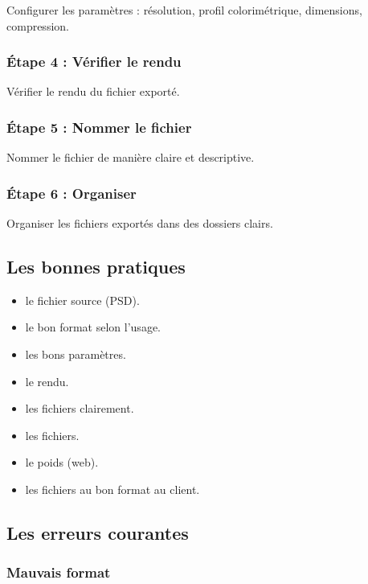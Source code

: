 Configurer les paramètres : résolution, profil colorimétrique, dimensions, compression.

\subsubsection{Étape 4 : Vérifier le rendu}

Vérifier le rendu du fichier exporté.

\subsubsection{Étape 5 : Nommer le fichier}

Nommer le fichier de manière claire et descriptive.

\subsubsection{Étape 6 : Organiser}

Organiser les fichiers exportés dans des dossiers clairs.

\subsection{Les bonnes pratiques}

\begin{itemize}
    \item {} le fichier source (PSD).
    \item {} le bon format selon l'usage.
    \item {} les bons paramètres.
    \item {} le rendu.
    \item {} les fichiers clairement.
    \item {} les fichiers.
    \item {} le poids (web).
    \item {} les fichiers au bon format au client.
\end{itemize}

\subsection{Les erreurs courantes}

\subsubsection{Mauvais format}

